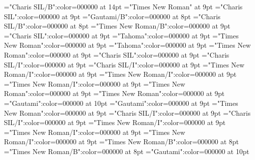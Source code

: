 \documentclass[gps1,twoside]{article}
\begin{document}
\font{}="Charis SIL/B":color=000000 at 14pt
\font{}="Times New Roman" at 9pt
\font\entryletDatadicBody="Charis SIL":color=000000 at 9pt
\font\headwordggoTeluINentryletDatadicBody="Gautami/B":color=000000 at 8pt
\font\headwordafterentryletDatadicBody="Charis SIL/B":color=000000 at 8pt
\font\spanenheadwordggoTeluINentryletDatadicBody="Times New Roman/B":color=000000 at 9pt
\font\spanentryletDatadicBody="Charis SIL":color=000000 at 9pt
\font\pronunciationggofonipaxemicspanentryletDatadicBody="Tahoma":color=000000 at 9pt
\font\spanenpronunciationggofonipaxemicspanentryletDatadicBody="Times New Roman":color=000000 at 9pt
\font\spanggofonipaxemicpronunciationggofonipaxemicspanentryletDatadicBody="Tahoma":color=000000 at 9pt
\font\spanenspanentryletDatadicBody="Times New Roman":color=000000 at 9pt
\font\sensespanentryletDatadicBody="Charis SIL":color=000000 at 9pt
\font\grammaticalinfosensespanentryletDatadicBody="Charis SIL/I":color=000000 at 9pt
\font\grammaticalinfoaftersensespanentryletDatadicBody="Charis SIL/I":color=000000 at 9pt
\font\partofspeechengrammaticalinfosensespanentryletDatadicBody="Times New Roman/I":color=000000 at 9pt
\font\spanenpartofspeechengrammaticalinfosensespanentryletDatadicBody="Times New Roman/I":color=000000 at 9pt
\font\spanengrammaticalinfosensespanentryletDatadicBody="Times New Roman/I":color=000000 at 9pt
\font{}="Times New Roman":color=000000 at 9pt
\font\spanendefinitionensensespanentryletDatadicBody="Times New Roman":color=000000 at 9pt
\font\LexSensepublishStemGlossPubLdtesensespanentryletDatadicBody="Gautami":color=000000 at 10pt
\font\spanteLexSensepublishStemGlossPubLdtesensespanentryletDatadicBody="Gautami":color=000000 at 9pt
\font\spanenLexSensepublishStemGlossPubLdtesensespanentryletDatadicBody="Times New Roman":color=000000 at 9pt
\font\grammaticalinfospanentryletDatadicBody="Charis SIL/I":color=000000 at 9pt
\font\grammaticalinfoafterspanentryletDatadicBody="Charis SIL/I":color=000000 at 9pt
\font\partofspeechengrammaticalinfospanentryletDatadicBody="Times New Roman/I":color=000000 at 9pt
\font\spanenpartofspeechengrammaticalinfospanentryletDatadicBody="Times New Roman/I":color=000000 at 9pt
\font\spanengrammaticalinfospanentryletDatadicBody="Times New Roman/I":color=000000 at 9pt
\font\xsensenumbersensespanentryletDatadicBody="Times New Roman/B":color=000000 at 8pt
\font\xsensenumberaftersensespanentryletDatadicBody="Times New Roman/B":color=000000 at 8pt
\font\xitemteLexSensepublishStemGlossPubLdtesensespanentryletDatadicBody="Gautami":color=000000 at 10pt
\end{document}
